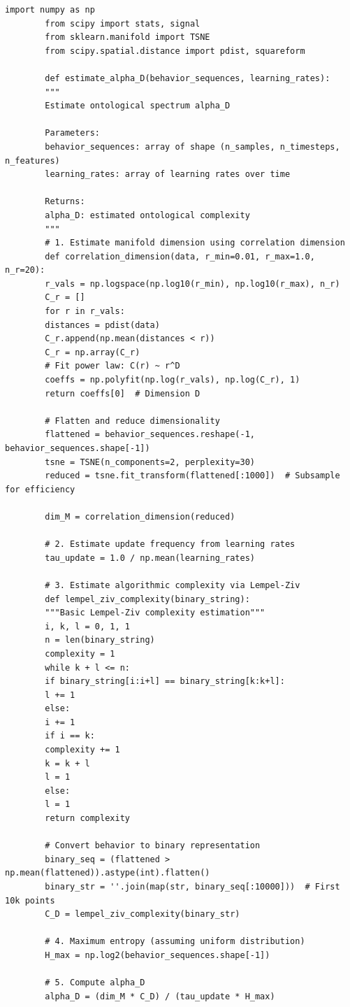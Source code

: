 \documentclass[12pt,a4paper]{article}
\begin{document}
	\begin{lstlisting}[caption={Python code for estimating UCD parameters from time series data}, label={lst:ucd-python}]
		import numpy as np
		from scipy import stats, signal
		from sklearn.manifold import TSNE
		from scipy.spatial.distance import pdist, squareform
		
		def estimate_alpha_D(behavior_sequences, learning_rates):
		"""
		Estimate ontological spectrum alpha_D
		
		Parameters:
		behavior_sequences: array of shape (n_samples, n_timesteps, n_features)
		learning_rates: array of learning rates over time
		
		Returns:
		alpha_D: estimated ontological complexity
		"""
		# 1. Estimate manifold dimension using correlation dimension
		def correlation_dimension(data, r_min=0.01, r_max=1.0, n_r=20):
		r_vals = np.logspace(np.log10(r_min), np.log10(r_max), n_r)
		C_r = []
		for r in r_vals:
		distances = pdist(data)
		C_r.append(np.mean(distances < r))
		C_r = np.array(C_r)
		# Fit power law: C(r) ~ r^D
		coeffs = np.polyfit(np.log(r_vals), np.log(C_r), 1)
		return coeffs[0]  # Dimension D
		
		# Flatten and reduce dimensionality
		flattened = behavior_sequences.reshape(-1, behavior_sequences.shape[-1])
		tsne = TSNE(n_components=2, perplexity=30)
		reduced = tsne.fit_transform(flattened[:1000])  # Subsample for efficiency
		
		dim_M = correlation_dimension(reduced)
		
		# 2. Estimate update frequency from learning rates
		tau_update = 1.0 / np.mean(learning_rates)
		
		# 3. Estimate algorithmic complexity via Lempel-Ziv
		def lempel_ziv_complexity(binary_string):
		"""Basic Lempel-Ziv complexity estimation"""
		i, k, l = 0, 1, 1
		n = len(binary_string)
		complexity = 1
		while k + l <= n:
		if binary_string[i:i+l] == binary_string[k:k+l]:
		l += 1
		else:
		i += 1
		if i == k:
		complexity += 1
		k = k + l
		l = 1
		else:
		l = 1
		return complexity
		
		# Convert behavior to binary representation
		binary_seq = (flattened > np.mean(flattened)).astype(int).flatten()
		binary_str = ''.join(map(str, binary_seq[:10000]))  # First 10k points
		C_D = lempel_ziv_complexity(binary_str)
		
		# 4. Maximum entropy (assuming uniform distribution)
		H_max = np.log2(behavior_sequences.shape[-1])
		
		# 5. Compute alpha_D
		alpha_D = (dim_M * C_D) / (tau_update * H_max)
		

\end{lstlisting}
\end{document}
